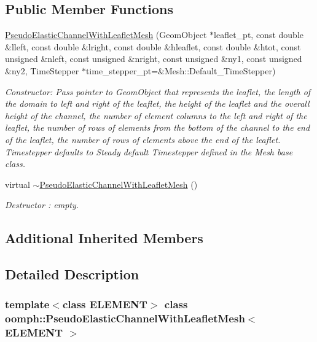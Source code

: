 \subsection*{Public Member Functions}
\begin{DoxyCompactItemize}
\item 
\hyperlink{classoomph_1_1PseudoElasticChannelWithLeafletMesh_a240a700ff3e934607b29d4ad14c6d70e}{Pseudo\+Elastic\+Channel\+With\+Leaflet\+Mesh} (Geom\+Object $\ast$leaflet\+\_\+pt, const double \&lleft, const double \&lright, const double \&hleaflet, const double \&htot, const unsigned \&nleft, const unsigned \&nright, const unsigned \&ny1, const unsigned \&ny2, Time\+Stepper $\ast$time\+\_\+stepper\+\_\+pt=\&Mesh\+::\+Default\+\_\+\+Time\+Stepper)
\begin{DoxyCompactList}\small\item\em Constructor\+: Pass pointer to Geom\+Object that represents the leaflet, the length of the domain to left and right of the leaflet, the height of the leaflet and the overall height of the channel, the number of element columns to the left and right of the leaflet, the number of rows of elements from the bottom of the channel to the end of the leaflet, the number of rows of elements above the end of the leaflet. Timestepper defaults to Steady default Timestepper defined in the Mesh base class. \end{DoxyCompactList}\item 
virtual \hyperlink{classoomph_1_1PseudoElasticChannelWithLeafletMesh_aaf0a9484052254d5840b4cde85a10a75}{$\sim$\+Pseudo\+Elastic\+Channel\+With\+Leaflet\+Mesh} ()
\begin{DoxyCompactList}\small\item\em Destructor \+: empty. \end{DoxyCompactList}\end{DoxyCompactItemize}
\subsection*{Additional Inherited Members}


\subsection{Detailed Description}
\subsubsection*{template$<$class E\+L\+E\+M\+E\+NT$>$\newline
class oomph\+::\+Pseudo\+Elastic\+Channel\+With\+Leaflet\+Mesh$<$ E\+L\+E\+M\+E\+N\+T $>$}

